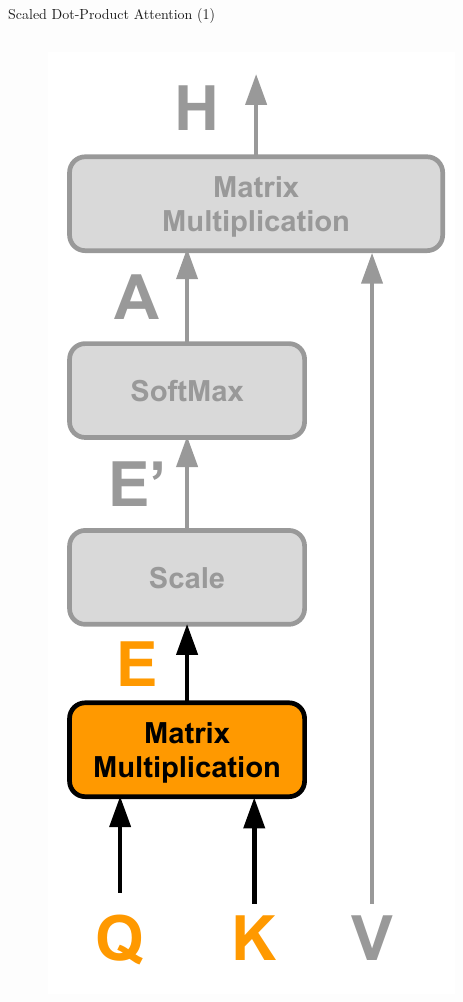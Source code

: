 \documentclass[10pt]{beamer}
\begin{document}
\begin{frame}[fragile]{Scaled Dot-Product Attention (1)}
    \begin{columns}
        \begin{figure}
            \centering
            \includegraphics[width=\textwidth]{figures/model/attention_step1.pdf}
        \end{figure}


\end{columns}
\end{frame}
\end{document}
